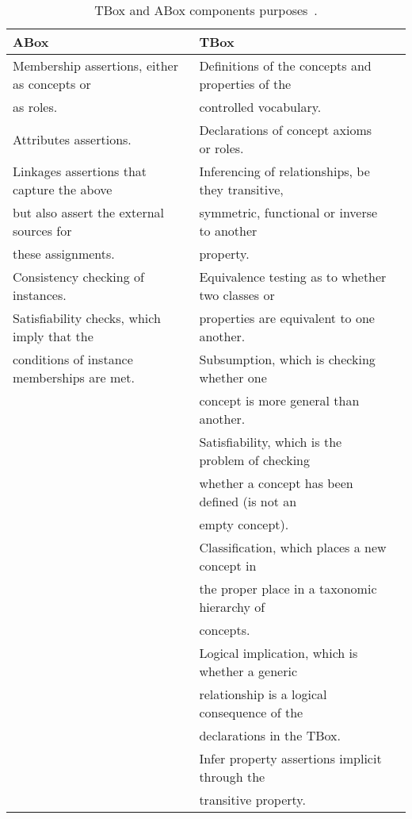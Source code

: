 \begin{table}
 \caption{TBox and ABox components purposes~\citep{abox_tbox}.}
 \label{tbl:dl_terminology}
 \footnotesize
 \centering
\begin{tabular}{l l l}
  \hline 
  \textbf{ABox} 				&  \textbf{TBox} \\
  \hline 
  Membership assertions, either as concepts or  & Definitions of the concepts and properties of the 	\\
  as roles. 					& controlled vocabulary.				\\
  Attributes assertions. 			& Declarations of concept axioms or roles.		\\
  Linkages assertions that capture the above	& Inferencing of relationships, be they transitive, 	\\
  but also assert the external sources for 	& symmetric, functional or inverse to another 		\\
  these assignments. 				& property.						\\
  Consistency checking of instances.		& Equivalence testing as to whether two classes or 	\\
  Satisfiability checks, which imply that the	& properties are equivalent to one another.		\\
  conditions of instance memberships are met.	& Subsumption, which is checking whether one 		\\
						& concept is more general than another.			\\
						& Satisfiability, which is the problem of checking 	\\
						& whether a concept has been defined (is not an 	\\
						& empty concept).					\\
						& Classification, which places a new concept in  	\\
						& the proper place in a taxonomic hierarchy of 		\\
						& concepts.						\\
						& Logical implication, which is whether a generic 	\\
						& relationship is a logical consequence of the		\\ 
						& declarations in the TBox.				\\
						& Infer property assertions implicit through the 	\\
						& transitive property.					\\	
\hline
\end{tabular}
\end{table}